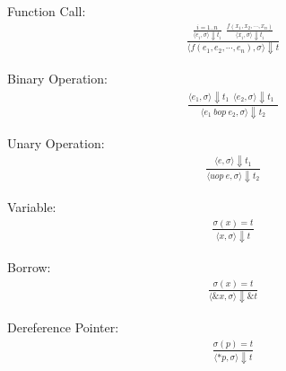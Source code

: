 \documentclass[12pt]{article}
\begin{document}
	Function Call: 
	\begin{align*}
		\frac{
			\frac{i = 1..n}
			{\langle e_i, \sigma \rangle\Downarrow t_i} \ \ 
			\frac{f(x_1, x_2, \cdots, x_n)}
			{\langle x_i, \sigma \rangle\Downarrow t_i}
		}
		{
			\langle f(e_1, e_2, \cdots, e_n), \sigma \rangle\Downarrow t
		}
	\end{align*}
	


	Binary Operation:
	\begin{align*}
		\frac{
			\langle e_1, \sigma \rangle\Downarrow t_1 \ \
			\langle e_2, \sigma \rangle\Downarrow t_1 \ \
		}
		{\langle e_1\ bop\ e_2, \sigma \rangle\Downarrow t_2}
	\end{align*}
	
	Unary Operation:
	\begin{align*}
		\frac{
			\langle e, \sigma \rangle\Downarrow t_1
		}
		{\langle uop\ e, \sigma \rangle\Downarrow t_2}
	\end{align*}

	Variable: 
	\begin{align*}
		\frac{
			\sigma(x) = t
		}
		{\langle x, \sigma \rangle\Downarrow t}
	\end{align*}
	
	Borrow:
	\begin{align*}
		\frac{
			\sigma(x) = t
		}
		{\langle \&x, \sigma \rangle\Downarrow \&t}
	\end{align*}
	
	Dereference Pointer:
	\begin{align*}
		\frac{
			\sigma(p) = t
		}
		{\langle *p, \sigma \rangle\Downarrow t}
	\end{align*}
\end{document}
